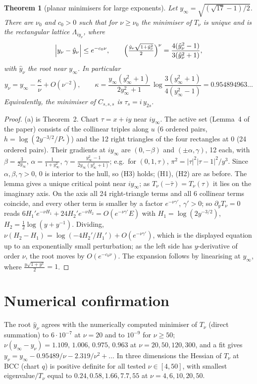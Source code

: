 \documentclass[11pt]{article}
\newtheorem{theorem}{Theorem}
\theoremstyle{remark}\newtheorem{remark}[theorem]{Remark}
\begin{document}
\begin{theorem}[planar minimisers for large exponents]\label{thm:2d}
Let $y_\infty=\sqrt{(\sqrt{17}-1)/2}$. There are $\nu_0$ and $c_0>0$ such that for $\nu\ge\nu_0$ the minimiser of $T_\nu$ is unique and is the rectangular lattice $\Lambda_{iy_\nu}$, where
\[\Bigl|y_\nu-\hat y_\nu\Bigr|\le e^{-c_0\nu},\qquad \Bigl(\tfrac{\hat y_\nu\sqrt{1+\hat y_\nu^2}}2\Bigr)^{\nu}=\frac{4(\hat y_\nu^2-1)}{3(\hat y_\nu^2+1)},\]
with $\hat y_\nu$ the root near $y_\infty$. In particular
\[y_\nu=y_\infty-\frac\kappa\nu+O(\nu^{-2}),\qquad\kappa=\frac{y_\infty(y_\infty^2+1)}{2y_\infty^2+1}\,\log\frac{3(y_\infty^2+1)}{4(y_\infty^2-1)}=0.954894963\ldots\]
Equivalently, the minimiser of $C_{s,s,s}$ is $\tau_s=i\,y_{2s}$.
\end{theorem}
\begin{proof}
(a) is Theorem~2. Chart $\tau=x+iy$ near $iy_\infty$. The active set (Lemma~4 of the paper) consists of the collinear triples along $u$ (6 ordered pairs, $h=\log(2y^{-3/2}/P_*)$) and the 12 right triangles of the four rectangles at $0$ (24 ordered pairs). Their gradients at $iy_\infty$ are $(0,-\beta)$ and $(\pm\alpha,\gamma)$, 12 each, with $\beta=\frac3{2y_\infty}$, $\alpha=\frac1{1+y_\infty^2}$, $\gamma=\frac{y_\infty^2-1}{2y_\infty(y_\infty^2+1)}$; e.g.\ for $(0,1,\tau)$, $\pi^2=|\tau|^2|\tau-1|^2/y^3$. Since $\alpha,\beta,\gamma>0$, $0$ is interior to the hull, so (H3) holds; (H1), (H2) are as before. The lemma gives a unique critical point near $iy_\infty$; as $T_\nu(-\bar\tau)=T_\nu(\tau)$ it lies on the imaginary axis. On the axis all 24 right-triangle terms and all 6 collinear terms coincide, and every other term is smaller by a factor $e^{-\nu\gamma'}$, $\gamma'>0$; so $\partial_yT_\nu=0$ reads $6H_1'e^{-\nu H_1}+24H_2'e^{-\nu H_2}=O(e^{-\nu\gamma'}E)$ with $H_1=\log(2y^{-3/2})$, $H_2=\frac12\log(y+y^{-1})$. Dividing, $\nu(H_2-H_1)=\log(-4H_2'/H_1')+O(e^{-\nu\gamma'})$, which is the displayed equation up to an exponentially small perturbation; as the left side has $y$-derivative of order $\nu$, the root moves by $O(e^{-c_0\nu})$. The expansion follows by linearising at $y_\infty$, where $\frac{y\sqrt{1+y^2}}2=1$.
\end{proof}

\section{Numerical confirmation}
The root $\hat y_\nu$ agrees with the numerically computed minimiser of $T_\nu$ (direct summation) to $6\cdot10^{-7}$ at $\nu=20$ and to $10^{-9}$ for $\nu\ge50$; $\nu(y_\infty-y_\nu)=1.109,\,1.006,\,0.975,\,0.963$ at $\nu=20,50,120,300$, and a fit gives $y_\nu=y_\infty-0.95489/\nu-2.319/\nu^2+\dots$ In three dimensions the Hessian of $T_\nu$ at BCC (chart $q$) is positive definite for all tested $\nu\in[4,50]$, with smallest eigenvalue$/T_\nu$ equal to $0.24,0.58,1.66,7.7,55$ at $\nu=4,6,10,20,50$.
\end{document}
